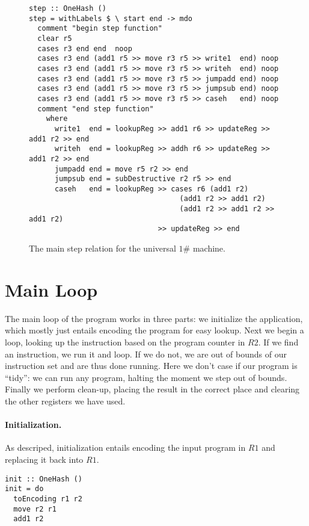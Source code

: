 \documentclass[10pt, preprint, nocopyrightspace]{sigplanconf}
\newcommand{\oh}{$1\#$\xspace}
\begin{document}
\begin{figure*}
\begin{lstlisting}
step :: OneHash ()
step = withLabels $ \ start end -> mdo
  comment "begin step function"
  clear r5
  cases r3 end end  noop
  cases r3 end (add1 r5 >> move r3 r5 >> write1  end) noop
  cases r3 end (add1 r5 >> move r3 r5 >> writeh  end) noop
  cases r3 end (add1 r5 >> move r3 r5 >> jumpadd end) noop
  cases r3 end (add1 r5 >> move r3 r5 >> jumpsub end) noop
  cases r3 end (add1 r5 >> move r3 r5 >> caseh   end) noop
  comment "end step function"
    where
      write1  end = lookupReg >> add1 r6 >> updateReg >> add1 r2 >> end
      writeh  end = lookupReg >> addh r6 >> updateReg >> add1 r2 >> end
      jumpadd end = move r5 r2 >> end
      jumpsub end = subDestructive r2 r5 >> end
      caseh   end = lookupReg >> cases r6 (add1 r2)
                                   (add1 r2 >> add1 r2)
                                   (add1 r2 >> add1 r2 >> add1 r2)
                              >> updateReg >> end
\end{lstlisting}
\caption{\label{fig:step}The main step relation for the universal \oh machine.}
\end{figure*}

\section{Main Loop}

The main loop of the program works in three parts: we initialize the
application, which mostly just entails encoding the program for easy lookup.
Next we begin a loop, looking up the instruction based on the program counter
in $R2$. If we find an instruction, we run it and loop. If we do not, we
are out of bounds of our instruction set and are thus done running.
Here we don't case if our program is ``tidy'': we can run any program, halting
the moment we step out of bounds. Finally we perform clean-up, placing the result
in the correct place and clearing the other registers we have used.

\paragraph{Initialization.}

As descriped, initialization entails encoding the input program in $R1$ and
replacing it back into $R1$.

\begin{lstlisting}
init :: OneHash ()
init = do
  toEncoding r1 r2
  move r2 r1
  add1 r2
\end{lstlisting}
\end{document}
